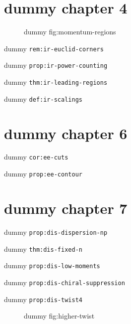 \clearpage\begingroup\small
\setcounter{chapter}{4}\addtocounter{chapter}{-1}
\chapter{dummy chapter 4}
\begin{figure}[h]\centering{}\caption{dummy fig:momentum-regions}\label{fig:momentum-regions}\end{figure}
\begin{remark}\label{rem:ir-euclid-corners}dummy \texttt{rem:ir-euclid-corners}\end{remark}
\begin{proposition}\label{prop:ir-power-counting}dummy \texttt{prop:ir-power-counting}\end{proposition}
\begin{theorem}\label{thm:ir-leading-regions}dummy \texttt{thm:ir-leading-regions}\end{theorem}
\begin{definition}\label{def:ir-scalings}dummy \texttt{def:ir-scalings}\end{definition}
\setcounter{chapter}{6}\addtocounter{chapter}{-1}
\chapter{dummy chapter 6}
\begin{corollary}\label{cor:ee-cuts}dummy \texttt{cor:ee-cuts}\end{corollary}
\begin{proposition}\label{prop:ee-contour}dummy \texttt{prop:ee-contour}\end{proposition}
\setcounter{chapter}{7}\addtocounter{chapter}{-1}
\chapter{dummy chapter 7}
\begin{proposition}\label{prop:dis-dispersion-np}dummy \texttt{prop:dis-dispersion-np}\end{proposition}
\begin{theorem}\label{thm:dis-fixed-n}dummy \texttt{thm:dis-fixed-n}\end{theorem}
\begin{proposition}\label{prop:dis-low-moments}dummy \texttt{prop:dis-low-moments}\end{proposition}
\begin{proposition}\label{prop:dis-chiral-suppression}dummy \texttt{prop:dis-chiral-suppression}\end{proposition}
\begin{proposition}\label{prop:dis-twist4}dummy \texttt{prop:dis-twist4}\end{proposition}
\begin{figure}[h]\centering{}\caption{dummy fig:higher-twist}\label{fig:higher-twist}\end{figure}
\setcounter{chapter}{9}\addtocounter{chapter}{-1}
